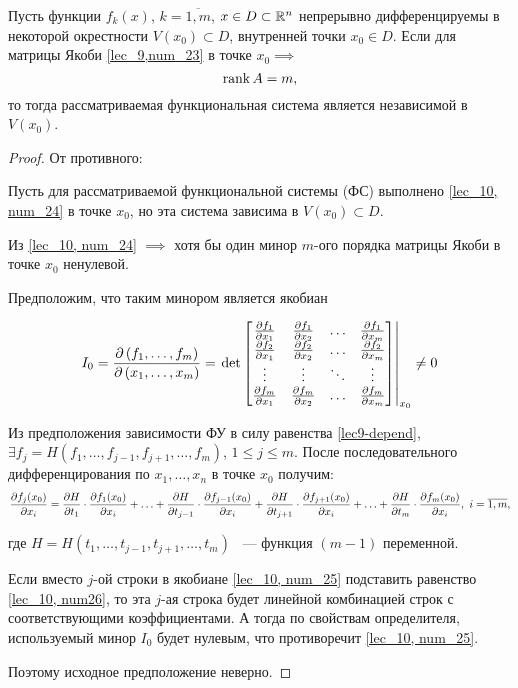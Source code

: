 \documentclass[../../main.tex]{subfiles}
\begin{document}
\begin{thm}
	Пусть функции $f_k\left(x\right)$, $k = \overline{1,m}$,
	$x \in D \subset \mathbb{R}^n$ непрерывно дифференцируемы в некоторой 
	окрестности $V(x_0) \subset D$, внутренней точки $x_0 \in D$. Если 
	для матрицы Якоби \eqref{lec_9,num_23} в точке $x_0 \implies$ 
	\begin{equation} \label{lec_10, num_24}
		\operatorname{rank} A = m,
	\end{equation}
 	то тогда рассматриваемая функциональная система 
 	является независимой в $V(x_0)$.
\end{thm}

\begin{proof}
	От противного:
	
	Пусть для рассматриваемой функциональной системы (ФС) 
	выполнено \eqref{lec_10, num_24} в точке $x_0$, но эта система 
	зависима в $V(x_0) \subset D$.
	
	Из \eqref{lec_10, num_24} $\implies$ хотя бы один минор $m$-ого 
	порядка матрицы Якоби в точке $x_0$ ненулевой.
	
	Предположим, что таким минором является якобиан
	
	\begin{equation} \label{lec_10, num_25}
		I_0 = \frac{\partial \left( f_1, \ldots, f_m \right)}{\partial  \left(x_1, 
		\ldots, x_m \right) } = \left.\det 
		\begin{bmatrix}
		\frac{\partial f_1}{\partial x_1} & \frac{\partial f_1}{\partial x_2} & \ldots & \frac{\partial f_1}{\partial x_m} \\
		\frac{\partial f_2}{\partial x_1} & \frac{\partial f_2}{\partial x_2} & \ldots & \frac{\partial f_2}{\partial x_m}\\
		\vdots & \vdots & \ddots & \vdots \\
		\frac{\partial f_m}{\partial x_1} & \frac{\partial f_m}{\partial x_2} & \ldots & \frac{\partial f_m}{\partial x_m}
		\end{bmatrix} \right|_{x_0}
		\neq 0
	\end{equation} 
	
	Из предположения зависимости ФУ в силу равенства 
	\eqref{lec9-depend},
	$\exists f_j = H( f_1, \ldots, f_{j-1}, f_{j+1}, \ldots, 
	f_m)$, $1 \le j \le m$.
	После последовательного дифференцирования по $x_1, \ldots, 
	x_n$ в точке $x_0$ получим:
	\begin{equation} \label{lec_10, num26}
		\frac{\partial f_j(x_0)}{\partial x_i} = \frac{\partial H}{\partial t_1}\cdot
		\frac{\partial f_1(x_0)}{\partial x_i} + \ldots + \frac{\partial H}{\partial  t_{j-1} } \cdot
		\frac{\partial  f_{j-1}(x_0) }{\partial x_i} + \frac{\partial H}{\partial  t_{j+1} } \cdot
		\frac{\partial  f_{j+1}(x_0) }{\partial x_i} + \ldots + \frac{\partial H}{\partial t_m} \cdot
	    \frac{\partial  f_m(x_0) }{\partial x_i},\ i = \overline{1, m},
	\end{equation}
	
	где $H = H\left( t_1, \ldots, t_{j-1}, t_{j+1}, \ldots, t_m 
	\right)$ ~--- функция $(m-1)$ переменной.
	
	Если вместо $j$-ой строки в якобиане \eqref{lec_10, num_25}
	подставить равенство \eqref{lec_10, num26}, то эта $j$-ая 
	строка будет линейной комбинацией строк с соответствующими 
	коэффициентами. А тогда по свойствам определителя, 
	используемый минор $I_0$ будет нулевым, что противоречит 
	\eqref{lec_10, num_25}.
	
	Поэтому исходное предположение неверно.
\end{proof}
\end{document}
